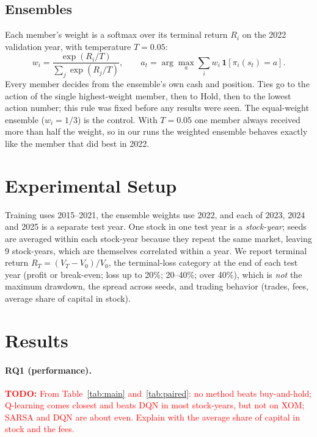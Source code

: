 \documentclass[11pt]{article}
\newcommand{\todo}[1]{\textcolor{red}{\textbf{TODO:} #1}}
\begin{document}
\subsection{Ensembles}
Each member's weight is a softmax over its terminal return $R_i$ on the 2022
validation year, with temperature $T = 0.05$:
\begin{equation}
w_i = \frac{\exp(R_i/T)}{\sum_{j}\exp(R_j/T)}, \qquad
a_t = \arg\max_{a} \sum_{i} w_i\,\mathbf{1}\!\left[\pi_i(s_t)=a\right].
\label{eq:ensemble}
\end{equation}
Every member decides from the ensemble's own cash and position. Ties go to
the action of the single highest-weight member, then to Hold, then to the
lowest action number; this rule was fixed before any results were seen. The
equal-weight ensemble ($w_i = 1/3$) is the control. With $T=0.05$ one member
always received more than half the weight, so in our runs the weighted
ensemble behaves exactly like the member that did best in 2022.

\section{Experimental Setup}
\label{sec:setup}
Training uses 2015--2021, the ensemble weights use 2022, and each of 2023,
2024 and 2025 is a separate test year. One stock in one test year is a
\emph{stock-year}; seeds are averaged within each stock-year because they
repeat the same market, leaving 9 stock-years, which are themselves
correlated within a year. We report terminal return $R_T=(V_T-V_0)/V_0$,
the terminal-loss category at the end of each test year (profit or
break-even; loss up to 20\%; 20--40\%; over 40\%), which is \emph{not} the
maximum drawdown, the spread across seeds, and trading behavior (trades,
fees, average share of capital in stock).

\section{Results}
\label{sec:results}




\paragraph{RQ1 (performance).}
\todo{From Table~\ref{tab:main} and~\ref{tab:paired}: no method beats
buy-and-hold; Q-learning comes closest and beats DQN in most stock-years,
but not on XOM; SARSA and DQN are about even. Explain with the average
share of capital in stock and the fees.}
\end{document}
